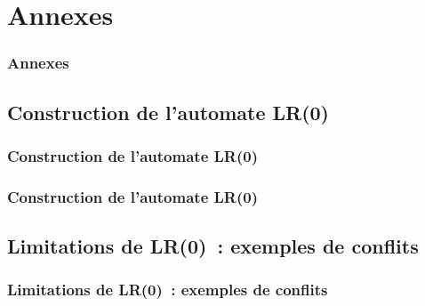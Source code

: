 
\label{secannexes}
\section{Annexes}

\begin{frame}
    \frametitle{Annexes}
    \tableofcontents[
        currentsection,
        sections=\value{section},
        subsubsectionstyle=hide
    ]
\end{frame}
\addtocounter{framenumber}{-1}

\subsection{Construction de l’automate LR(0)}
\begin{frame}
    \frametitle{Construction de l’automate LR(0)}

    \begin{minipage}{0.3\textwidth}
    
    \end{minipage}%
    \begin{minipage}{0.7\textwidth}
        \begin{center}
        \maxsizebox{\textwidth}{0.8\textheight}{
            
        }
        \end{center}
    \end{minipage}
\end{frame}
\addtocounter{framenumber}{-1}

\begin{frame}
    \frametitle{Construction de l’automate LR(0)}

    \begin{center}
    \maxsizebox{\textwidth}{0.8\textheight}{
        
    }
    \end{center}
\end{frame}
\addtocounter{framenumber}{-1}

\subsection{Limitations de LR(0)~: exemples de conflits}

\begin{frame}
    \frametitle{Limitations de LR(0)~: exemples de conflits}

    
    \pause
    
\end{frame}
\addtocounter{framenumber}{-1}

